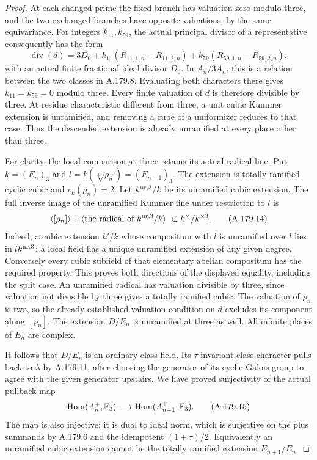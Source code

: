 \begin{proof}
At each changed prime the fixed branch has valuation zero modulo
three, and the two exchanged branches have opposite valuations,
by the same equivariance.  For integers \(k_{11},k_{59}\), the
actual principal divisor of a representative consequently has
the form
\[
 \operatorname{div}(d)=3D_0+
 k_{11}(R_{11,1,n}-R_{11,2,n})+
 k_{59}(R_{59,1,n}-R_{59,2,n}),
\tag{A.179.13}
\]
with an actual finite fractional ideal divisor \(D_0\).
In \(A_n/3A_n\), this is a relation between the two classes in
A.179.8.  Evaluating both characters there gives
\(k_{11}=k_{59}=0\) modulo three.
Every finite valuation of \(d\) is therefore divisible by three.
At residue characteristic different from three, a unit cubic
Kummer extension is unramified, and removing a cube of a
uniformizer reduces to that case.  Thus the descended extension
is already unramified at every place other than three.

For clarity, the local comparison at three retains its actual
radical line.  Put \(k=(E_n)_3\) and
\(l=k(\sqrt[3]{\rho_n})=(E_{n+1})_3\).
The extension is totally ramified cyclic cubic and
\(v_k(\rho_n)=2\).  Let \(k^{\rm ur,3}/k\) be its unramified
cubic extension.  The full inverse image of the unramified
Kummer line under restriction to \(l\) is
\[
 \langle[\rho_n]\rangle+
 \langle\text{the radical of }k^{\rm ur,3}/k\rangle
          \ \subset k^\times/k^{\times3}.
\tag{A.179.14}
\]
Indeed, a cubic extension \(k'/k\) whose compositum with \(l\)
is unramified over \(l\) lies in \(l k^{\rm ur,3}\): a local
field has a unique unramified extension of any given degree.
Conversely every cubic subfield of that elementary abelian
compositum has the required property.  This proves both
directions of the displayed equality, including the split case.
An unramified radical has valuation divisible by three, since
valuation not divisible by three gives a totally ramified cubic.
The valuation of \(\rho_n\) is two, so the already established
valuation condition on \(d\) excludes its component along
\([\rho_n]\).  The extension \(D/E_n\) is unramified at three
as well.  All infinite places of \(E_n\) are complex.

It follows that \(D/E_n\) is an ordinary class field.  Its
\(\tau\)-invariant class character pulls back to \(\lambda\)
by A.179.11, after choosing the generator of its cyclic Galois
group to agree with the given generator upstairs.
We have proved surjectivity of the actual pullback map
\[
 \operatorname{Hom}(A_n^+,\mathbb F_3)
       \longrightarrow\operatorname{Hom}(A_{n+1}^+,\mathbb F_3).
\tag{A.179.15}
\]
The map is also injective: it is dual to ideal norm, which is
surjective on the plus summands by A.179.6 and the idempotent
\((1+\tau)/2\).  Equivalently an unramified cubic extension
cannot be the totally ramified extension \(E_{n+1}/E_n\).


\end{proof}
